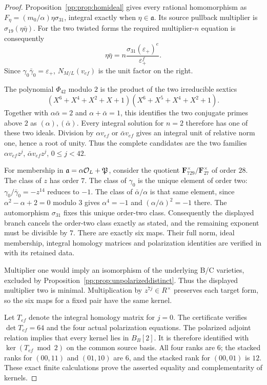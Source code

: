 \begin{proof}
Proposition~\ref{pp:prop:homideal} gives every rational homomorphism
as $F_\eta=(m_0/\alpha)\eta\sigma_{31}$, integral exactly when
$\eta\in\mathfrak a$. Its source pullback multiplier is
$\sigma_{19}(\eta\bar\eta)$. For the two twisted forms the required
multiplier-$n$ equation is consequently
\[
 \eta\bar\eta=n\frac{\sigma_{31}(\varepsilon_+)^e}
                         {\varepsilon_+^f}.
\]
Since $\gamma_0\bar\gamma_0=\varepsilon_+$,
$N_{M/L}(v_{ef})$ is the unit factor on the right.

The polynomial $\Phi_{42}$ modulo $2$ is the product of the two
irreducible sextics
\[
 (X^6+X^4+X^2+X+1)(X^6+X^5+X^4+X^2+1).
\]
Together with $\alpha\bar\alpha=2$ and
$\alpha+\bar\alpha=1$, this identifies the two conjugate primes
above $2$ as $(\alpha),(\bar\alpha)$.
Every integral solution for $n=2$ therefore has one of these two
ideals. Division by $\alpha v_{ef}$ or $\bar\alpha v_{ef}$ gives
an integral unit of relative norm one, hence a root of unity.
Thus the complete candidates are the two families
$\alpha v_{ef}z^j$, $\bar\alpha v_{ef}z^j$, $0\le j<42$.

For membership in $\mathfrak a=\alpha\mathcal O_L+\mathfrak P$,
consider the quotient $\mathbf F_{729}^\times/\mathbf F_{27}^\times$
of order $28$. The class of $z$ has order $7$.
The class of $\gamma_0$ is the unique element of order two:
$\gamma_0/\bar\gamma_0=-z^{14}$ reduces to $-1$.
The class of $\bar\alpha/\alpha$ is that same element, since
$\alpha^2-\alpha+2=0$ modulo $3$ gives
$\alpha^4=-1$ and $(\alpha/\bar\alpha)^2=-1$ there.
The automorphism $\sigma_{31}$ fixes this unique order-two class.
Consequently the displayed branch cancels the order-two class
exactly as stated, and the remaining exponent must be divisible by $7$.
There are exactly six maps. Their full norm, ideal membership,
integral homology matrices and polarization identities are verified in
 with its retained data.

Multiplier one would imply an isomorphism of the underlying B/C
varieties, excluded by Proposition~\ref{pp:prop:unpolarizeddistinct}.
Thus the displayed multiplier two is minimal. Multiplication by
$z^{7j}\in R^\times$ preserves each target form, so the six maps
for a fixed pair have the same kernel.

Let $T_{ef}$ denote the integral homology matrix for $j=0$.
The certificate verifies $\det T_{ef}=64$ and the four actual
polarization equations. The polarized adjoint relation implies
that every kernel lies in $B_B[2]$. It is therefore identified with
$\ker(T_{ef}\bmod2)$ on the common source basis.
All four ranks are $6$; the stacked ranks for $(00,11)$ and
$(01,10)$ are $6$, and the stacked rank for $(00,01)$ is $12$.
These exact finite calculations prove the asserted equality and
complementarity of kernels.
\end{proof}

